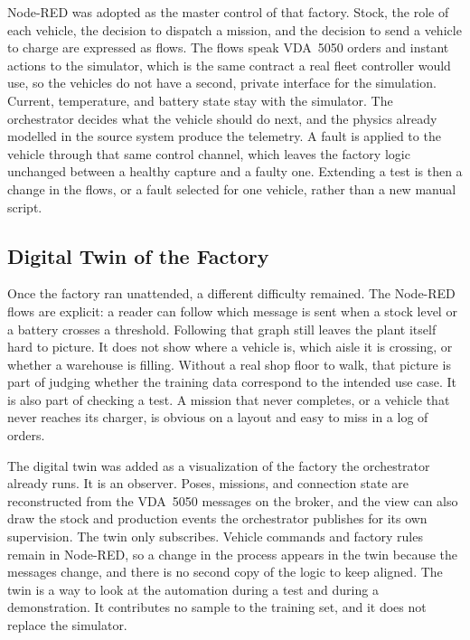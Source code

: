 Node-RED was adopted as the master control of that factory. Stock, the role of each vehicle, the decision to dispatch a mission, and the decision to send a vehicle to charge are expressed as flows. The flows speak VDA~5050 orders and instant actions to the simulator, which is the same contract a real fleet controller would use, so the vehicles do not have a second, private interface for the simulation. Current, temperature, and battery state stay with the simulator. The orchestrator decides what the vehicle should do next, and the physics already modelled in the source system produce the telemetry. A fault is applied to the vehicle through that same control channel, which leaves the factory logic unchanged between a healthy capture and a faulty one. Extending a test is then a change in the flows, or a fault selected for one vehicle, rather than a new manual script.

\subsection{Digital Twin of the Factory}
\label{subsec:arch_digital_twin}

Once the factory ran unattended, a different difficulty remained. The Node-RED flows are explicit: a reader can follow which message is sent when a stock level or a battery crosses a threshold. Following that graph still leaves the plant itself hard to picture. It does not show where a vehicle is, which aisle it is crossing, or whether a warehouse is filling. Without a real shop floor to walk, that picture is part of judging whether the training data correspond to the intended use case. It is also part of checking a test. A mission that never completes, or a vehicle that never reaches its charger, is obvious on a layout and easy to miss in a log of orders.

The digital twin was added as a visualization of the factory the orchestrator already runs. It is an observer. Poses, missions, and connection state are reconstructed from the VDA~5050 messages on the broker, and the view can also draw the stock and production events the orchestrator publishes for its own supervision. The twin only subscribes. Vehicle commands and factory rules remain in Node-RED, so a change in the process appears in the twin because the messages change, and there is no second copy of the logic to keep aligned. The twin is a way to look at the automation during a test and during a demonstration. It contributes no sample to the training set, and it does not replace the simulator.


